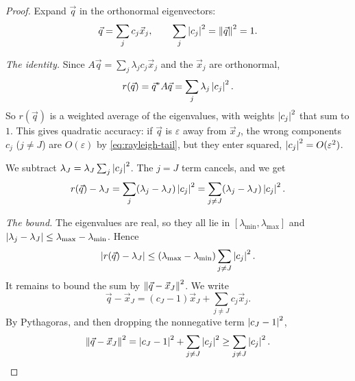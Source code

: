 \begin{proof}
  Expand $\vec{q}$ in the orthonormal eigenvectors:
  \begin{equation*}
    \vec{q} = \sum_j c_j\vec{x}_j, \qquad \sum_j\left\lvert c_j \right\rvert^2 = \left\lVert \vec{q} \right\rVert^2 = 1.
  \end{equation*}

  \emph{The identity.} Since $A\vec{q} = \sum_j \lambda_j c_j\vec{x}_j$ and the $\vec{x}_j$ are orthonormal,
  \begin{equation}
    r(\vec{q}) = \vec{q}^\ast A\vec{q} = \sum_j\lambda_j\left\lvert c_j \right\rvert^2.
  \end{equation}
  So $r(\vec{q})$ is a weighted average of the eigenvalues, with weights $\left\lvert c_j \right\rvert^2$ that sum to $1$. This gives quadratic accuracy: if $\vec{q}$ is $\varepsilon$ away from $\vec{x}_J$, the wrong components $c_j$ ($j \ne J$) are $O(\varepsilon)$ by \eqref{eq:rayleigh-tail}, but they enter squared, $\left\lvert c_j \right\rvert^2 = O(\varepsilon^2)$.

  We subtract $\lambda_J = \lambda_J\sum_j\left\lvert c_j \right\rvert^2$. The $j = J$ term cancels, and we get
  \begin{equation*}
    r(\vec{q}) - \lambda_J = \sum_j(\lambda_j - \lambda_J)\left\lvert c_j \right\rvert^2 = \sum_{j \ne J}(\lambda_j - \lambda_J)\left\lvert c_j \right\rvert^2.
  \end{equation*}

  \emph{The bound.} The eigenvalues are real, so they all lie in $[\lambda_{\min}, \lambda_{\max}]$ and $\left\lvert \lambda_j - \lambda_J \right\rvert \le \lambda_{\max} - \lambda_{\min}$. Hence
  \begin{equation*}
    \left\lvert r(\vec{q}) - \lambda_J \right\rvert \le (\lambda_{\max} - \lambda_{\min})\sum_{j \ne J}\left\lvert c_j \right\rvert^2.
  \end{equation*}
  It remains to bound the sum by $\left\lVert \vec{q} - \vec{x}_J \right\rVert^2$. We write
  \begin{equation*}
    \vec{q} - \vec{x}_J = (c_J - 1)\vec{x}_J + \sum_{j \ne J}c_j\vec{x}_j.
  \end{equation*}
  By Pythagoras, and then dropping the nonnegative term $\left\lvert c_J - 1 \right\rvert^2$,
  \begin{equation}
    \label{eq:rayleigh-tail}
    \left\lVert \vec{q} - \vec{x}_J \right\rVert^2 = \left\lvert c_J - 1 \right\rvert^2 + \sum_{j \ne J}\left\lvert c_j \right\rvert^2 \ge \sum_{j \ne J}\left\lvert c_j \right\rvert^2. \qedhere
  \end{equation}
\end{proof}

